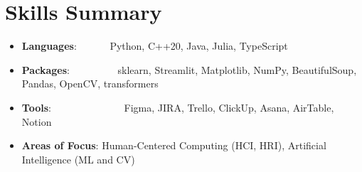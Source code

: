 \documentclass[a4paper,11pt]{extarticle}
\newcommand{\resumeSkillItem}[2]{
	\item\small{
		\textbf{#1}{: #2 \vspace{-2pt}}
	}
}
\newcommand{\resumeSubItem}[2]{\resumeSkillItem{#1}{#2}\vspace{-5pt}}
\newcommand{\resumeSubHeadingListStart}{
    \begin{itemize}[leftmargin=0.15in,label={}]}
\newcommand{\resumeSubHeadingListEnd}{\end{itemize}}
\begin{document}
\section{Skills Summary}
	\resumeSubHeadingListStart
		\resumeSubItem{Languages}
            {\hspace{0.2mm}~~~~~~Python, C++20, Java, Julia, TypeScript}
		\resumeSubItem{Packages}
            {\hspace{0.2mm}~~~~~~~~~sklearn, Streamlit, Matplotlib, NumPy, BeautifulSoup, Pandas, OpenCV, transformers}
            \resumeSubItem{Tools}
            {\hspace{0.2mm}~~~~~~~~~~~~~~Figma, JIRA, Trello, ClickUp, Asana, AirTable, Notion }
            \resumeSubItem{Areas of Focus}
            {\hspace{0.2mm}Human-Centered Computing (HCI, HRI), Artificial Intelligence (ML and CV)}          
	\resumeSubHeadingListEnd
\end{document}
